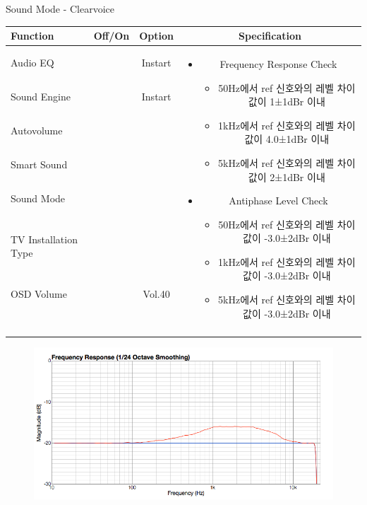 \begin{frame}[t]{Sound Mode - Clearvoice}
\begin{tiny}
\begin{tabular}{@{}lccc@{}}
\toprule
Function & Off/On & Option & Specification \\
\midrule
Audio EQ & \color{black}{Off} & Instart &
\multirow{10}{60mm}{
\begin{itemize}
\item Frequency Response Check
	\begin{itemize}
	\item 50Hz에서 ref 신호와의 레벨 차이값이 1±1dBr 이내
	\item 1kHz에서 ref 신호와의 레벨 차이값이 4.0±1dBr 이내
	\item 5kHz에서 ref 신호와의 레벨 차이값이 2±1dBr 이내
	\end{itemize}
\item Antiphase Level Check
	\begin{itemize}
	\item 50Hz에서 ref 신호와의 레벨 차이값이 -3.0±2dBr 이내
	\item 1kHz에서 ref 신호와의 레벨 차이값이 -3.0±2dBr 이내
	\item 5kHz에서 ref 신호와의 레벨 차이값이 -3.0±2dBr 이내
	\end{itemize}
\end{itemize}
} \\
Sound Engine & \color{blue}{On} & Instart & \\
Autovolume & \color{black}{Off} & & \\
Smart Sound & \color{black}{Off} & & \\
Sound Mode & \color{blue}{On} & \color{blue}{Clearvoice} & \\
TV Installation Type & \color{blue}{On} & \color{black}{Standtype1} & \\
OSD Volume & \color{blue}{On} & Vol.40 & \\
& & & \\
& & & \\
& & & \\
& & & \\
\midrule
\end{tabular}
\end{tiny}

\begin{figure}[b]
\includegraphics[height=0.4\textwidth]{figures/clearvoice.png}
\end{figure}

\end{frame}